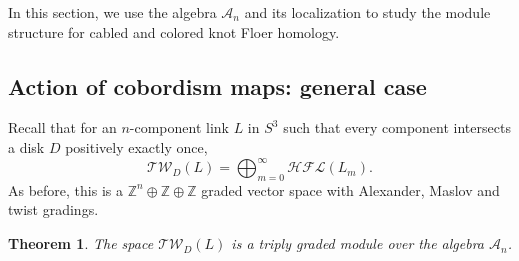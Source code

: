 \documentclass[10pt,a4paper]{amsart}
\theoremstyle{plain}
\newtheorem{theorem}{Theorem}
\newcommand{\CA}{\mathcal{A}}
\newcommand{\Tw}{\mathcal{TW}}
\newcommand{\cHFL}{\mathcal{H\!F\! L}}
\newcommand{\Z}{\mathbb{Z}}
\begin{document}
In this section, we use the algebra $\CA_n$ and its localization to study the module structure for cabled and colored knot Floer homology. 

\subsection{Action of cobordism maps: general case}
Recall that for an $n$-component link $L$ in $S^3$ such that every component intersects a disk $D$ positively exactly once, 
$$
\Tw_D(L)=\bigoplus_{m=0}^{\infty}\cHFL(L_m).
$$
As before, this is a $\Z^n\oplus \Z\oplus \Z$ graded vector space with Alexander, Maslov and twist gradings.

\begin{theorem}
\label{thm: cabled module}
The space $\Tw_D(L)$ is a triply graded module over the algebra $\CA_n$.
\end{theorem}
\end{document}
